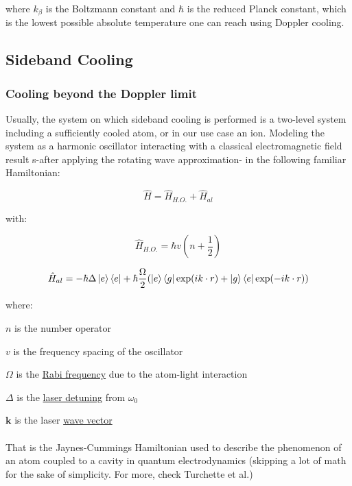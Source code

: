 \documentclass[../main.tex]{subfiles}
\begin{document}
\noindent
where $k_{\beta}$ is the Boltzmann constant and $\hbar$ is the reduced Planck constant, which is the lowest possible absolute temperature one can reach using Doppler cooling.

\subsection{Sideband Cooling}

\subsubsection{Cooling beyond the Doppler limit}
\tab Usually, the system on which sideband cooling is performed is a two-level system including a sufficiently cooled atom, or in our use case an ion. Modeling the system as a harmonic oscillator interacting with a classical electromagnetic field result s-after applying the rotating wave approximation- in the following familiar Hamiltonian:

\begin{equation}
    \hat{H} = \hat{H}_{H.O.} + \hat{H}_{al}
\end{equation}

\noindent with:

\begin{equation}
    \hat{H}_{H.O.} = \hbar v (n + \frac{1}{2})
\end{equation}

\begin{equation}
    \hat{H}_{al} = -\hbar\Delta\ket{e}\bra{e} + \hbar\frac{\Omega}{2}(\ket{e}\bra{g}\exp(ik\cdot r) + \ket{g}\bra{e}\exp(-ik\cdot r) )
\end{equation}

where:

$n$ is the number operator

$v$ is the frequency spacing of the oscillator

$\Omega$  is the \href{https://en.wikipedia.org/wiki/Rabi_frequency}{Rabi frequency} due to the atom-light interaction

$\Delta$  is the \href{https://en.wikipedia.org/wiki/Laser_detuning}{laser detuning} from $\omega_{0}$

$\mathbf{k}$  is the laser \href{https://en.wikipedia.org/wiki/Wave_vector}{wave vector}
\\
\\
\tab That is the Jaynes-Cummings Hamiltonian used to describe the phenomenon of an atom coupled to a cavity in quantum electrodynamics (skipping a lot of math for the sake of simplicity. For more, check Turchette et al.)
\end{document}
